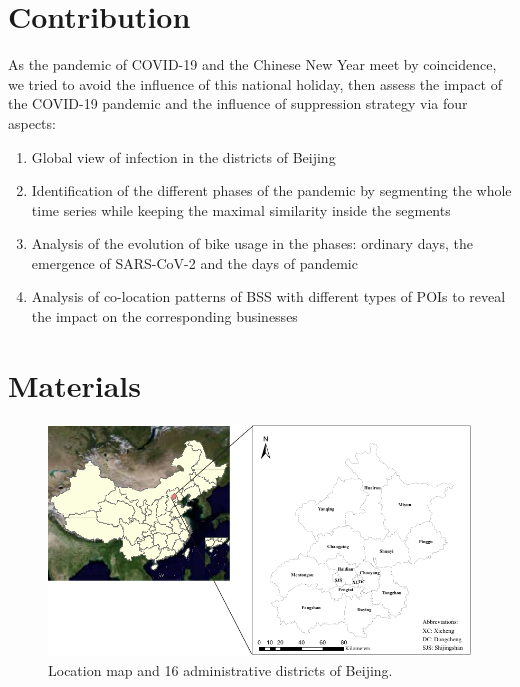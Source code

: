 \documentclass[preprints,article,accept,moreauthors,pdftex]{Definitions/mdpi}
\begin{document}
\section*{Contribution} As the pandemic of COVID-19 and the Chinese New Year meet by coincidence, we tried to avoid the influence of this national holiday, then assess the impact of the COVID-19 pandemic and the influence of suppression strategy via four aspects:
\begin{enumerate}
    \item Global view of infection in the districts of Beijing
    \item Identification of the different phases of the pandemic by segmenting the whole time series while keeping the maximal similarity inside the segments
    \item Analysis of the evolution of bike usage in the phases: ordinary days, the emergence of SARS-CoV-2 and the days of pandemic
    \item Analysis of co-location patterns of BSS with different types of POIs to reveal the impact on the corresponding businesses
\end{enumerate}

\section{Materials}

\begin{figure}[ht]
    \centering
    \includegraphics[width=\textwidth]{Figures/StudyArea.pdf}
    \caption{Location map and 16 administrative districts of Beijing.}
    \label{fig:study_area}
\end{figure}
\end{document}
